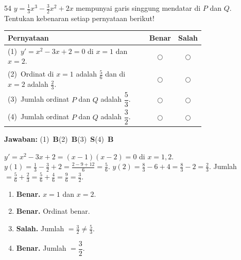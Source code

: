 \documentclass[11pt]{article}
\newcommand{\jawaban}[1]{%
  \noindent\colorbox{gold!30}{\parbox{\dimexpr\linewidth-2\fboxsep\relax}{%
    \textbf{Jawaban:} #1}}\par\smallskip}
\begin{document}
\begin{soal}{54}
$y=\tfrac13x^3-\tfrac32x^2+2x$ mempunyai garis singgung mendatar di $P$ dan $Q$.
Tentukan kebenaran setiap pernyataan berikut!

\par\smallskip
{\renewcommand{\arraystretch}{1.4}%
\begin{tabular}{@{}p{0.76\linewidth}cc@{}}
\hline\textbf{Pernyataan}&\textbf{Benar}&\textbf{Salah}\\\hline
(1)~$y'=x^2-3x+2=0$ di $x=1$ dan $x=2$.&$\bigcirc$&$\bigcirc$\\
(2)~Ordinat di $x=1$ adalah $\tfrac{5}{6}$ dan di $x=2$ adalah $\tfrac{2}{3}$.&$\bigcirc$&$\bigcirc$\\
(3)~Jumlah ordinat $P$ dan $Q$ adalah $\dfrac{5}{3}$.&$\bigcirc$&$\bigcirc$\\
(4)~Jumlah ordinat $P$ dan $Q$ adalah $\dfrac{3}{2}$.&$\bigcirc$&$\bigcirc$\\\hline
\end{tabular}}
\end{soal}
\begin{pembox}
\jawaban{(1)~\textbf{B}\quad(2)~\textbf{B}\quad(3)~\textbf{S}\quad(4)~\textbf{B}}
$y'=x^2-3x+2=(x-1)(x-2)=0$ di $x=1,2$.
$y(1)=\tfrac13-\tfrac32+2=\tfrac{2-9+12}{6}=\tfrac56$.\quad
$y(2)=\tfrac83-6+4=\tfrac83-2=\tfrac23$.
Jumlah $=\tfrac56+\tfrac23=\tfrac56+\tfrac46=\tfrac96=\tfrac32$.
\begin{enumerate}[leftmargin=*,topsep=2pt,itemsep=2pt]
\item \textbf{Benar.} $x=1$ dan $x=2$.
\item \textbf{Benar.} Ordinat benar.
\item \textbf{Salah.} Jumlah $=\tfrac32\neq\tfrac53$.
\item \textbf{Benar.} Jumlah $=\dfrac32$.
\end{enumerate}
\end{pembox}
\end{document}
